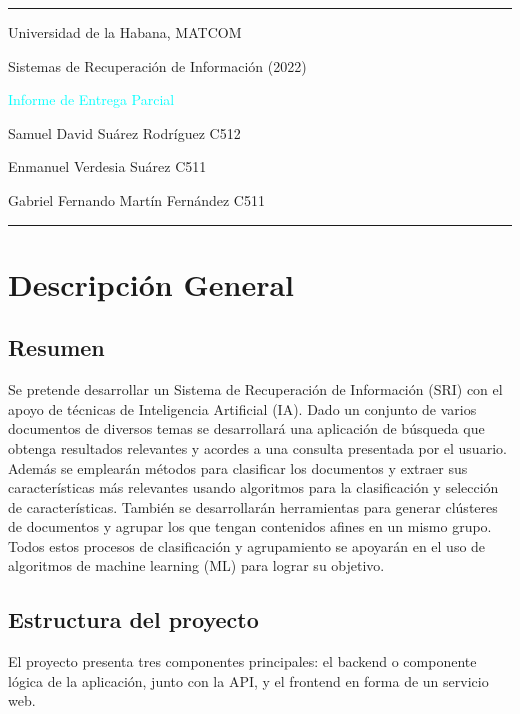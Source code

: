 \documentclass[a4paper,11pt]{article}
\begin{document}
\begin{center}
\large{
\rule{\textwidth}{0.5pt}
\par Universidad de la Habana, MATCOM
\par Sistemas de Recuperación de Información (2022)
\vspace{0.4cm}
\par \textcolor{cyan}{Informe de Entrega Parcial}
\par Samuel David Suárez Rodríguez C512
\par Enmanuel Verdesia Suárez C511
\par Gabriel Fernando Martín Fernández C511
\rule{\textwidth}{1.5pt}
}

\end{center}

\section{Descripción General}
\vspace{0.5cm}
\subsection{Resumen}
\par Se pretende desarrollar un Sistema de Recuperación de Información (SRI) con el apoyo de técnicas de Inteligencia Artificial (IA). Dado un conjunto de varios documentos de diversos temas se desarrollará una aplicación de búsqueda que obtenga resultados relevantes y acordes a una consulta presentada por el usuario. Además se emplearán métodos para clasificar los documentos y extraer sus características más relevantes usando algoritmos para la clasificación y selección de características. También se desarrollarán herramientas para generar clústeres de documentos y agrupar los que tengan contenidos afines en un mismo grupo. Todos estos procesos de clasificación y agrupamiento se apoyarán en el uso de algoritmos de machine learning (ML) para lograr su objetivo.

\subsection{Estructura del proyecto}
\par El proyecto presenta tres componentes principales: el backend o componente lógica de la aplicación, junto con la API, y el frontend en forma de un servicio web.
\end{document}
